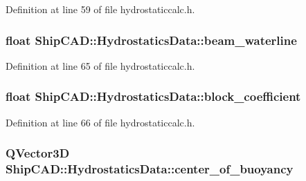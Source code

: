 Definition at line 59 of file hydrostaticcalc.\+h.

\subsubsection[{\texorpdfstring{beam\+\_\+waterline}{beam_waterline}}]{\setlength{\rightskip}{0pt plus 5cm}float Ship\+C\+A\+D\+::\+Hydrostatics\+Data\+::beam\+\_\+waterline}\hypertarget{structShipCAD_1_1HydrostaticsData_ab79755f5814572be0dfd3ae3ba214fca}{}\label{structShipCAD_1_1HydrostaticsData_ab79755f5814572be0dfd3ae3ba214fca}


Definition at line 65 of file hydrostaticcalc.\+h.

\subsubsection[{\texorpdfstring{block\+\_\+coefficient}{block_coefficient}}]{\setlength{\rightskip}{0pt plus 5cm}float Ship\+C\+A\+D\+::\+Hydrostatics\+Data\+::block\+\_\+coefficient}\hypertarget{structShipCAD_1_1HydrostaticsData_ac59c717b9869f0aacca4305fd81d4882}{}\label{structShipCAD_1_1HydrostaticsData_ac59c717b9869f0aacca4305fd81d4882}


Definition at line 66 of file hydrostaticcalc.\+h.

\subsubsection[{\texorpdfstring{center\+\_\+of\+\_\+buoyancy}{center_of_buoyancy}}]{\setlength{\rightskip}{0pt plus 5cm}Q\+Vector3D Ship\+C\+A\+D\+::\+Hydrostatics\+Data\+::center\+\_\+of\+\_\+buoyancy}\hypertarget{structShipCAD_1_1HydrostaticsData_a316b31598f53f036c7008cc4910293f8}{}\label{structShipCAD_1_1HydrostaticsData_a316b31598f53f036c7008cc4910293f8}


